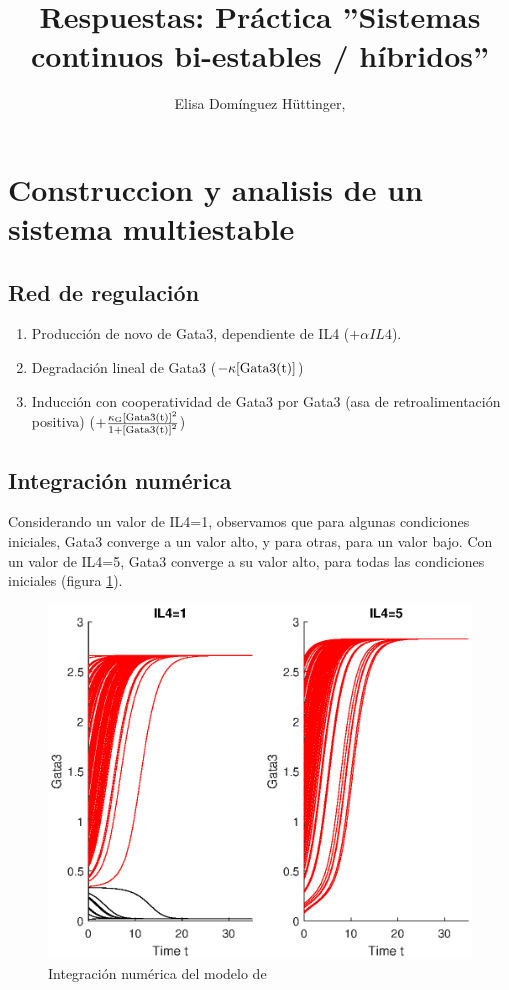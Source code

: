 \documentclass[10pt,letterpaper]{article}
\title{
\textbf{Respuestas: Práctica ''Sistemas continuos bi-estables / híbridos''}}
\author{Elisa Dom\'{i}nguez H\"{u}ttinger, }
\begin{document}
 \maketitle

\section{Construccion y analisis de un sistema multiestable}


\subsection{Red de regulación}

\begin{enumerate}
\item Producción de novo de Gata3, dependiente de IL4 ($+\alpha IL4$).
\item Degradación lineal de Gata3 ($-\kappa {\rm[Gata3(t)]}$)
\item  Inducción con cooperatividad de Gata3 por Gata3 (asa de retroalimentación positiva) ($+\frac { \kappa_{\rm G} {\rm[Gata3(t)]}^{2}} {1+{\rm [Gata3(t)]}^{2}}$)
\end{enumerate}

\subsection{Integración numérica}



Considerando un valor de IL4=1, observamos que para algunas condiciones iniciales, Gata3 converge a un valor alto, y para otras, para un valor bajo. 
Con un valor de IL4=5, Gata3 converge a su valor alto, para todas las condiciones iniciales (figura \ref{fig:Gata3_t}).

\begin{figure}[h!]
  \centering
 \includegraphics[scale=.5]{Gata3_t} 
  \caption{Integración numérica del modelo de \cite{Hofer2002}}
 \label{fig:Gata3_t}
\end{figure}
\end{document}

